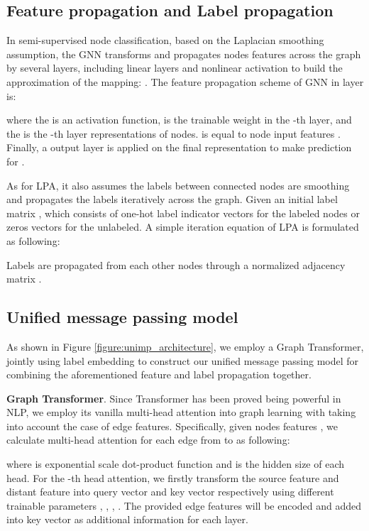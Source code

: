 \documentclass{article} \usepackage{iclr2021_conference,times}
\begin{document}
\subsection{Feature propagation and Label propagation}
In semi-supervised node classification, based on the Laplacian smoothing assumption, the GNN transforms and propagates nodes features  across the graph by several layers, including linear layers and nonlinear activation to build the approximation
of the mapping: . The feature propagation scheme of GNN in layer  is:

where the  is an activation function,  is the trainable weight in the -th layer, and the  is the -th layer representations of nodes.  is equal to node input features . Finally, a  output layer is applied on the final representation to make prediction for .

As for LPA, it also assumes the labels between connected nodes are smoothing and propagates the labels iteratively across the graph. Given an initial label matrix , which consists of one-hot label indicator vectors  for the labeled nodes or zeros vectors for the unlabeled. A simple iteration equation of LPA is formulated as following:

Labels are propagated from each other nodes through a normalized adjacency matrix . 


\subsection{Unified message passing model}

As shown in Figure \ref{figure:unimp_architecture}, we employ a Graph Transformer, jointly using label embedding to construct our unified message passing model for combining the aforementioned feature and label propagation together.

{\bf Graph Transformer}. Since Transformer \citep{vaswani2017attention} has been proved being powerful in NLP, we employ its vanilla multi-head attention into graph learning with taking into account the case of edge features. Specifically, given nodes features , we calculate multi-head attention for each edge from  to  as following:

where  is exponential scale dot-product function and  is the hidden size of each head.
 For the -th head attention, we firstly transform the source feature  and distant feature  into query vector and key vector  respectively using different trainable parameters , , , . The provided edge features  will be encoded and added into key vector as additional information for each layer.
\end{document}
